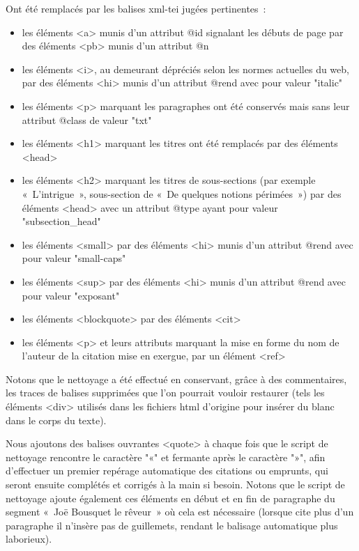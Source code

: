 \documentclass[12pt, a4paper]{article}
\begin{document}
Ont été remplacés par les balises xml-tei jugées pertinentes~:
\begin{itemize}
    \item les éléments <a> munis d'un attribut @id signalant les débuts de page par des éléments <pb> munis d'un attribut @n
    \item les éléments <i>, au demeurant dépréciés selon les normes actuelles du web, par des éléments <hi> munis d'un attribut @rend avec pour valeur "italic"
    \item les éléments <p> marquant les paragraphes ont été conservés mais sans leur attribut @class de valeur "txt"
    \item les éléments <h1> marquant les titres ont été remplacés par des éléments <head>
    \item les éléments <h2> marquant les titres de sous-sections (par exemple «~L'intrigue~», sous-section de «~De quelques notions périmées~») par des éléments <head> avec un attribut @type ayant pour valeur "subsection\_head"
    \item les éléments <small> par des éléments <hi> munis d'un attribut @rend avec pour valeur "small-caps"
    \item les éléments <sup> par des éléments <hi> munis d'un attribut @rend avec pour valeur "exposant"
    \item les éléments <blockquote> par des éléments <cit>
    \item les éléments <p> et leurs attributs marquant la mise en forme du nom de l'auteur de la citation mise en exergue, par un élément <ref>
\end{itemize}

Notons que le nettoyage a été effectué en conservant, grâce à des commentaires, les traces de balises supprimées que l'on pourrait vouloir restaurer (tels les éléments <div> utilisés dans les fichiers html d'origine pour insérer du blanc dans le corps du texte).

Nous ajoutons des balises ouvrantes <quote> à chaque fois que le script de nettoyage rencontre le caractère "«" et fermante après le caractère "»", afin d'effectuer un premier repérage automatique des citations ou emprunts, qui seront ensuite complétés et corrigés à la main si besoin. Notons que le script de nettoyage ajoute également ces éléments en début et en fin de paragraphe du segment «~Joë Bousquet le rêveur~» où cela est nécessaire (lorsque \robbe{} cite plus d'un paragraphe il n'insère pas de guillemets, rendant le balisage automatique plus laborieux).
\end{document}
